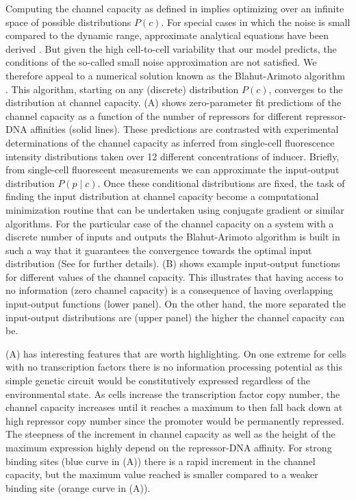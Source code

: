 Computing the channel capacity as defined in  implies
optimizing over an infinite space of possible distributions $P(c)$. For special
cases in which the noise is small compared to the dynamic range, approximate
analytical equations have been derived \cite{Tkacik2008a}. But given the high
cell-to-cell variability that our model predicts, the conditions of the
so-called small noise approximation are not satisfied. We therefore appeal to a
numerical solution known as the Blahut-Arimoto algorithm \cite{Blahut1972}.
This algorithm, starting on any (discrete) distribution $P(c)$, converges to
the distribution at channel capacity. (A) shows
zero-parameter fit predictions of the channel capacity as a function of the
number of repressors for different repressor-DNA affinities (solid lines).
These predictions are contrasted with experimental determinations of the
channel capacity as inferred from single-cell fluorescence intensity
distributions taken over 12 different concentrations of inducer. Briefly, from
single-cell fluorescent measurements we can approximate the input-output
distribution $P(p \mid c)$. Once these conditional distributions are fixed, the
task of finding the input distribution at channel capacity become a
computational minimization routine that can be undertaken using conjugate
gradient or similar algorithms. For the particular case of the channel capacity
on a system with a discrete number of inputs and outputs the Blahut-Arimoto
algorithm is built in such a way that it guarantees the convergence towards the
optimal input distribution (See  for further details).
(B) shows example input-output functions for different
values of the channel capacity. This illustrates that having access to no
information (zero channel capacity) is a consequence of having overlapping
input-output functions (lower panel). On the other hand, the more separated the
input-output distributions are (upper panel) the higher the channel capacity
can be.

(A) has interesting features that are worth highlighting.
On one extreme for cells with no transcription factors there is no information
processing potential as this simple genetic circuit would be constitutively
expressed regardless of the environmental state. As cells increase the
transcription factor copy number, the channel capacity increases until it
reaches a maximum to then fall back down at high repressor copy number since
the promoter would be permanently repressed. The steepness of the increment in
channel capacity as well as the height of the maximum expression highly depend
on the repressor-DNA affinity. For strong binding sites (blue curve in
(A)) there is a rapid increment in the channel capacity,
but the maximum value reached is smaller compared to a weaker binding site
(orange curve in (A)).

